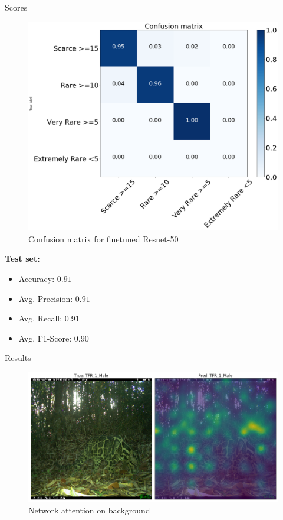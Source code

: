 \documentclass[10pt]{beamer}
\begin{document}
\begin{frame}{Scores}
	\centering
	\begin{minipage}[c]{0.58\linewidth}
		\begin{figure}
			\includegraphics[width=\columnwidth]{images/conf_mat_leo_v2.png}
			\caption{Confusion matrix for finetuned Resnet-50}
		\end{figure}
	\end{minipage}
	\begin{minipage}[c]{0.38\linewidth}
		\textbf{Test set:}
		\begin{itemize}
			\item Accuracy: $0.91$
			\item Avg. Precision: $0.91$      
			\item Avg. Recall: $0.91$
			\item Avg. F1-Score: $0.90$
		\end{itemize}
	\end{minipage}
\end{frame}

\begin{frame}{Results}
	\centering
	\begin{figure}
		\includegraphics[width=\columnwidth]{images/result_leo_3.png}
		\caption{Network attention on background}
	\end{figure}
\end{frame}
\end{document}
